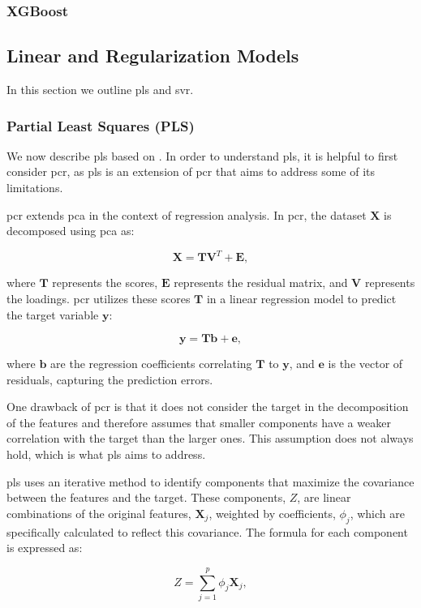 \subsubsection{XGBoost}

\subsection{Linear and Regularization Models}
In this section we outline \gls{pls} and \gls{svr}.
\subsubsection{Partial Least Squares (PLS)}
We now describe \gls{pls} based on \citet{James2023AnIS}.
In order to understand \gls{pls}, it is helpful to first consider \gls{pcr}, as \gls{pls} is an extension of \gls{pcr} that aims to address some of its limitations.

\gls{pcr} extends \gls{pca} in the context of regression analysis.
In \gls{pcr}, the dataset $\mathbf{X}$ is decomposed using \gls{pca} as:

$$
\mathbf{X} = \mathbf{TV}^T + \mathbf{E},
$$

where $\mathbf{T}$ represents the scores, $\mathbf{E}$ represents the residual matrix, and $\mathbf{V}$ represents the loadings.
\gls{pcr} utilizes these scores $\mathbf{T}$ in a linear regression model to predict the target variable $\mathbf{y}$:

$$
\mathbf{y} = \mathbf{Tb} + \mathbf{e},
$$

where $\mathbf{b}$ are the regression coefficients correlating $\mathbf{T}$ to $\mathbf{y}$, and $\mathbf{e}$ is the vector of residuals, capturing the prediction errors.

One drawback of \gls{pcr} is that it does not consider the target in the decomposition of the features and therefore assumes that smaller components have a weaker correlation with the target than the larger ones.
This assumption does not always hold, which is what \gls{pls} aims to address.

\gls{pls} uses an iterative method to identify components that maximize the covariance between the features and the target.
These components, $Z$, are linear combinations of the original features, $\mathbf{X}_j$, weighted by coefficients, $\phi_j$, which are specifically calculated to reflect this covariance.
The formula for each component is expressed as:

$$
    Z = \sum_{j=1}^{p} \phi_j \mathbf{X}_j,
$$

